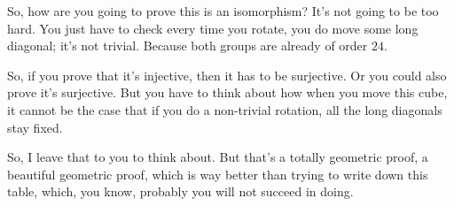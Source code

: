 \begin{speech}[00:41:47 - 00:42:34]
So, how are you going to prove this is an isomorphism? It's not going to be too hard. You just have to check every time you rotate, you do move some long diagonal; it's not trivial. Because both groups are already of order $24$.

So, if you prove that it's injective, then it has to be surjective. Or you could also prove it's surjective. But you have to think about how when you move this cube, it cannot be the case that if you do a non-trivial rotation, all the long diagonals stay fixed.

So, I leave that to you to think about. But that's a totally geometric proof, a beautiful geometric proof, which is way better than trying to write down this table, which, you know, probably you will not succeed in doing.
\end{speech}

